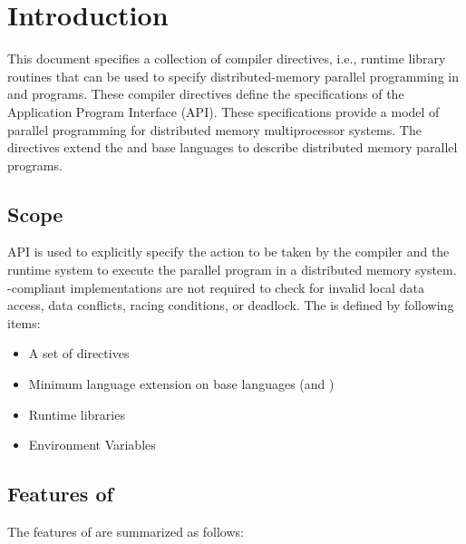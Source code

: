 
\setvruler[][][][3][0]
\chapter{Introduction}
\setcounter{page}{1}

This document specifies a collection of compiler
directives, i.e., runtime library routines that can be used to specify
distributed-memory parallel programming in \C and \Fort
programs. These compiler directives define the specifications of the \XMP Application
Program Interface (\XMP API). These specifications provide a
model of parallel programming for distributed memory multiprocessor
systems. The directives extend the \C and \Fort base languages to
describe distributed memory parallel programs.

\section{Scope}

\XMP API
is used to explicitly specify the action to be taken by the compiler
and the runtime system to execute the parallel program in a distributed
memory system. \XMP-compliant implementations are not required
to check for invalid local data access, data conflicts, racing
conditions, or deadlock. The \XMP is defined by following items:

\begin{itemize}
\item A set of directives
\item Minimum language extension on base languages (\C and \Fort)
\item Runtime libraries
\item Environment Variables
\end{itemize}

\section{Features of \XMP}

The features of \XMP are summarized as follows:

